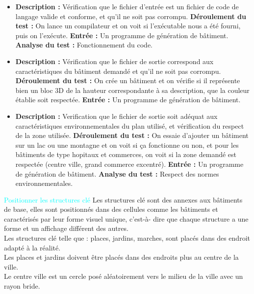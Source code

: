 {}
{
\begin{itemize}

\item \textbf{\tab Description : } Vérification que le fichier d'entrée est un fichier de code de langage valide et conforme, et qu'il ne soit pas corrompu.\newline
\textbf{\tab Déroulement du test : } On lance un compilateur et on voit si l'exécutable nous a été fourni, puis on l'exécute. \newline
\textbf{\tab Entrée : } Un programme de génération de bâtiment. \newline
\textbf{\tab Analyse du test : } Fonctionnement du code.

\item \textbf{\tab Description : }Vérification que le fichier de sortie correspond aux caractéristiques du bâtiment demandé et qu'il ne soit pas corrompu.\newline
\textbf{\tab Déroulement du test : } On crée un bâtiment et on vérifie si il représente bien un bloc 3D de la hauteur correspondante à sa description, que la couleur établie soit respectée.\newline
\textbf{\tab Entrée : } Un programme de génération de bâtiment.

\item \textbf{\tab Description : } Verification que le fichier de sortie soit adéquat aux caractéristiques environnementales du plan utilisé, et vérification du respect de la zone utilisée.\newline
\textbf{\tab Déroulement du test : } On essaie d'ajouter un bâtiment sur un lac ou une montagne et on voit si ça fonctionne ou non, et pour les bâtiments de type hopitaux et commerces, on voit si la zone demandé est respectée (centre ville, grand commerce excentré). \newline
\textbf{\tab Entrée : }  Un programme de génération de bâtiment. \newline
\textbf{\tab Analyse du test : } Respect des normes environnementales.

\end{itemize}
} 
\besoin{}
{\textcolor{cyan}{Positionner les structures clé}}
{
Les structures clé sont des annexes aux bâtiments de base, elles sont positionnés dans des cellules comme les bâtiments et caractérisés par leur forme visuel unique, c'est-à- dire que chaque structure a une forme et un affichage différent des autres.\\

Les structures clé telle que : places, jardins, marches, sont placés dans des endroit adapté à la réalité.\\

Les places et jardins doivent être placés dans des endroits plus au centre de la ville.\\

Le centre ville est un cercle posé aléatoirement vers le milieu de la ville avec un rayon bride.
}
